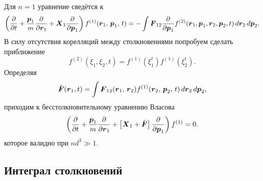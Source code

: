Для $n=1$ уравнение сведётся к
\begin{equation*}
	\left(
		\frac{\partial }{\partial t} + \frac{\boldsymbol{p}_1}{m} \frac{\partial }{\partial \boldsymbol{r}_1} + \boldsymbol{X}_1 \frac{\partial }{\partial \boldsymbol{p}_1} 
	\right) f^{(1)} (\boldsymbol{r}_1,\, \boldsymbol{p}_1,\, t) = - \int \boldsymbol{F}_{12} 
	\frac{\partial }{\partial \boldsymbol{p}_1} f^{(2)}(\boldsymbol{r}_1, \boldsymbol{p}_1, \boldsymbol{r}_2, \boldsymbol{p}_2, t) \, d \boldsymbol{r}_2 \, d \boldsymbol{p}_2.
\end{equation*}
В силу отсутствия корелляций между столкновениями попробуем сделать приближение
\begin{equation*}
 	f^{(2)}(\xi_1, \xi_2, t) = f^{(1)} (\xi_1^t)f^{(1)}(\xi_2^t).
\end{equation*}
Определяя
\begin{equation*}
	\tilde{\boldsymbol{F}} (\boldsymbol{r}_1, t) = \int \boldsymbol{F}_{12} (\boldsymbol{r}_1,\, \boldsymbol{r}_2) f^{(1)} (\boldsymbol{r}_2,\, \boldsymbol{p}_2,\, t) \, d \boldsymbol{r}_2 \, d \boldsymbol{p}_2,
\end{equation*}
приходим к бесстолкновительному уравнению Власова 
\begin{equation}
	\left(
		\frac{\partial }{\partial t} + \frac{\boldsymbol{p}_1}{m} \frac{\partial }{\partial \boldsymbol{r}_1}  + \left[
			\boldsymbol{X}_1 + \tilde{\boldsymbol{F}}
		\right] \frac{\partial }{\partial \boldsymbol{p}_1} 
	\right) f^{(1)} = 0.
\end{equation}
которое валидно при $n d^3 \gg 1$. 





\subsection{Интеграл столкновений}

